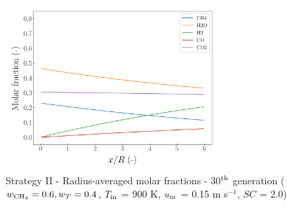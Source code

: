 \documentclass[preprint,12pt]{elsarticle}
\begin{document}
%

\begin{figure}[h!]
\centering
\includegraphics[width=80mm]{results/5Eq/60C_40T/GEN30-AVG.png}
\caption{\label{fig:5RES6040G30-avg} Strategy II - Radius-averaged molar fractions -  30$^{\rm{th}}$ generation ($w_{\rm{CH_4}} = 0.6, w_T = 0.4$, $T_{\rm{in}}$ = 900 K, $u_{\rm{in}}$ = 0.15 m s$^{-1}$, $SC$ = 2.0)}
\end{figure}
\end{document}
